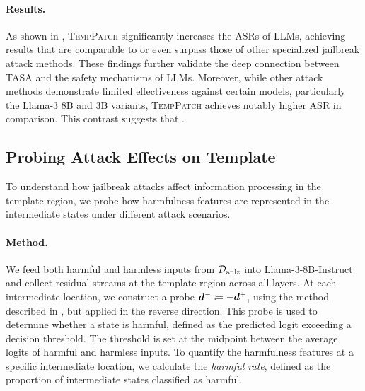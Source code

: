 \paragraph{Results.} 
As shown in , \textsc{TempPatch} significantly increases the ASRs of LLMs, achieving results that are comparable to or even surpass those of other specialized jailbreak attack methods. These findings further validate the deep connection between TASA and the safety mechanisms of LLMs. Moreover, while other attack methods demonstrate limited effectiveness against certain models, particularly the Llama-3 8B and 3B variants, \textsc{TempPatch} achieves notably higher ASR in comparison. This contrast suggests that .


\subsection{Probing Attack Effects on Template}

\label{subsec:prob_attack}

To understand how jailbreak attacks affect information processing in the template region, we probe how harmfulness features are represented in the intermediate states under different attack scenarios.


\paragraph{Method.} 
We feed both harmful and harmless inputs from \( {\mathcal{D}}_{\text{anlz}} \) into Llama-3-8B-Instruct and collect residual streams at the template region across all layers. At each intermediate location, we construct a probe \( {\bm{d}}^{-} \coloneqq -{\bm{d}}^{+} \), using the method described in , but applied in the reverse direction. This probe is used to determine whether a state is harmful, defined as the predicted logit exceeding a decision threshold. The threshold is set at the midpoint between the average logits of harmful and harmless inputs. To quantify the harmfulness features at a specific intermediate location, we calculate the \emph{harmful rate}, defined as the proportion of intermediate states classified as harmful.




